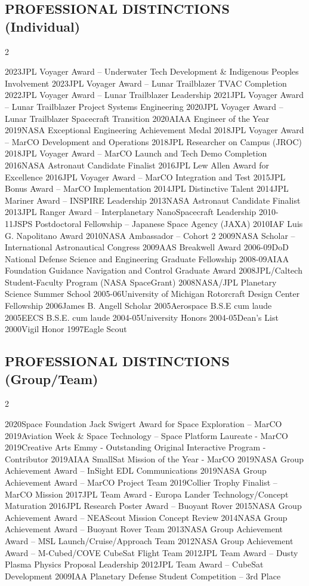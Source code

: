\documentclass[11pt,letterpaper]{article}
\begin{document}
\subsection*{PROFESSIONAL DISTINCTIONS (Individual)}
\begin{multicols}{2}

2023JPL Voyager Award – Underwater Tech Development \& Indigenous Peoples Involvement
2023JPL Voyager Award – Lunar Trailblazer TVAC Completion
2022JPL Voyager Award – Lunar Trailblazer Leadership
2021JPL Voyager Award – Lunar Trailblazer Project Systems Engineering
2020JPL Voyager Award – Lunar Trailblazer Spacecraft Transition
2020AIAA Engineer of the Year
2019NASA Exceptional Engineering Achievement Medal
2018JPL Voyager Award – MarCO Development and Operations
2018JPL Researcher on Campus (JROC)
2018JPL Voyager Award – MarCO Launch and Tech Demo Completion
2016NASA Astronaut Candidate Finalist
2016JPL Lew Allen Award for Excellence
2016JPL Voyager Award – MarCO Integration and Test
2015JPL Bonus Award – MarCO Implementation
2014JPL Distinctive Talent
2014JPL Mariner Award – INSPIRE Leadership
2013NASA Astronaut Candidate Finalist
2013JPL Ranger Award – Interplanetary NanoSpacecraft Leadership
2010-11JSPS Postdoctoral Fellowship – Japanese Space Agency (JAXA)
2010IAF Luis G. Napolitano Award
2010NASA Ambassador – Cohort 2
2009NASA Scholar – International Astronautical Congress
2009AAS Breakwell Award
2006-09DoD National Defense Science and Engineering Graduate Fellowship
2008-09AIAA Foundation Guidance Navigation and Control Graduate Award
2008JPL/Caltech Student-Faculty Program (NASA SpaceGrant)
2008NASA/JPL Planetary Science Summer School
2005-06University of Michigan Rotorcraft Design Center Fellowship
2006James B. Angell Scholar
2005Aerospace B.S.E cum laude
2005EECS B.S.E. cum laude
2004-05University Honors
2004-05Dean’s List
2000Vigil Honor
1997Eagle Scout


\end{multicols}
\subsection*{PROFESSIONAL DISTINCTIONS (Group/Team)}
\begin{multicols}{2}

2020Space Foundation Jack Swigert Award for Space Exploration – MarCO
2019Aviation Week \& Space Technology – Space Platform Laureate - MarCO
2019Creative Arts Emmy - Outstanding Original Interactive Program - Contributor
2019AIAA SmallSat Mission of the Year - MarCO
2019NASA Group Achievement Award – InSight EDL Communications
2019NASA Group Achievement Award – MarCO Project Team
2019Collier Trophy Finalist – MarCO Mission
2017JPL Team Award - Europa Lander Technology/Concept Maturation
2016JPL Research Poster Award – Buoyant Rover
2015NASA Group Achievement Award – NEAScout Mission Concept Review
2014NASA Group Achievement Award – Buoyant Rover Team
2013NASA Group Achievement Award – MSL Launch/Cruise/Approach Team
2012NASA Group Achievement Award – M-Cubed/COVE CubeSat Flight Team
2012JPL Team Award – Dusty Plasma Physics Proposal Leadership
2012JPL Team Award – CubeSat Development
2009IAA Planetary Defense Student Competition – 3rd Place


\end{multicols}
\end{document}

